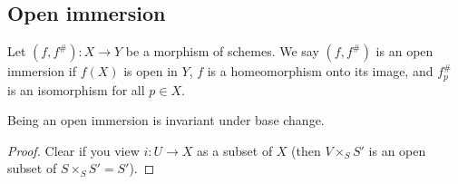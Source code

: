 \documentclass{memoir}
\begin{document}
\subsection{Open immersion}
\begin{definition}
    Let $(f,f^\#):X\to Y$ be a morphism of schemes.
    We say $(f,f^\#)$ is an open immersion if $f(X)$ is open in $Y$, $f$ is a homeomorphism onto its image, and $f_p^\#$ is an isomorphism for all $p\in X$.
\end{definition}
\begin{proposition}
    Being an open immersion is invariant under base change.
\end{proposition}
\begin{proof}
    Clear if you view $i:U\to X$ as a subset of $X$ (then $V\times_SS'$ is an open subset of $S\times_SS' = S'$).
\end{proof}
\end{document}
